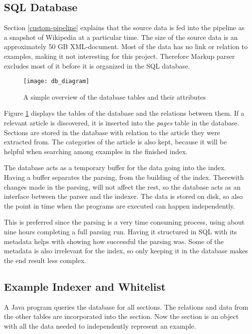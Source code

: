 \subsection{SQL Database}





Section \ref{custom-pipeline} explains that the source data is fed into the pipeline as a snapshot of Wikipedia at a particular time. The size of the source data is an approximately 50 GB XML-document. Most of the data has no link or relation to examples, making it not interesting for this project. Therefore Markup parser excludes most of it before it is organized in the SQL database. 

\begin{figure}[h] 
\caption{A simple overview of the database tables and their attributes}
\texttt{[image: db\_diagram]}
\label{fig:db_diagram}
\end{figure}

Figure \ref{fig:db_diagram} displays the tables of the database and the relations between them. If a relevant article is discovered, it is inserted into the \textit{pages} table in the database. Sections are stored in the database with relation to the article they were extracted from. The categories of the article is also kept, because it will be helpful when searching among examples in the finished index.  

The database acts as a temporary buffer for the data going into the index. Having a buffer separates the parsing, from the building of the index. Therewith changes made in the parsing, will not affect the rest, so the database acts as an interface between the parser and the indexer. The data is stored on disk, so also the point in time when the programs are executed can happen independently.

This is preferred since the parsing is a very time consuming process, using about nine hours completing a full parsing run. Having it structured in SQL with its metadata helps with showing how successful the parsing was. Some of the metadata is also irrelevant for the index, so only keeping it in the database  makes the end result less complex.


\subsection{Example Indexer and Whitelist} \label{imp_indexer}
A Java program queries the database for all sections. The relations and data from the other tables are incorporated into the section. Now the section is an object with all the data needed to independently represent an example.

